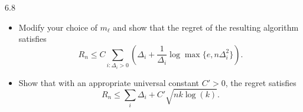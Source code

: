 \documentclass[10pt]{article}
\theoremstyle{definition}
\newenvironment{exercise*}[1]{%
  \IfBlankTF{#1}
    {\renewcommand{\themanualexerciseinner}{\unskip}}
    {\renewcommand\themanualexerciseinner{#1}}%
  \manualexerciseinner
}{\endmanualexerciseinner}
\begin{document}
\begin{exercise*}{6.8}
\begin{itemize}
        where $C > 0$ is a carefully chosen universal constant.
        \item[(e)] Modify your choice of $m_\ell$ and show that the regret of the resulting algorithm satisfies
        \begin{equation*}
            R_n \leq C \sum_{i:\Delta_i>0}
            \left(
                \Delta_i
                + \frac{1}{\Delta_i}\log\max\{e,n\Delta_i^2\}
            \right).
        \end{equation*}
        \item[(f)] Show that with an appropriate universal constant $C' > 0$, the regret satisfies
        \begin{equation*}
            R_n \leq \sum_i \Delta_i + C'\sqrt{nk\log(k)}.
        \end{equation*}
    \end{itemize}
\end{exercise*}
\end{document}
